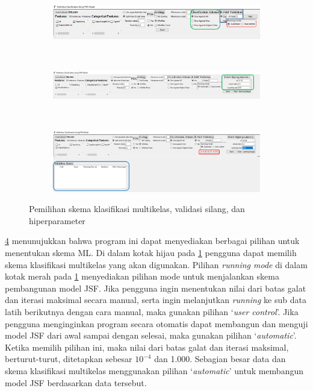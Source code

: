 \begin{figure}[h!]
\begin{subfigure}[h]{\textwidth}
  \centering
  \includegraphics[width=.98\linewidth]{SSprogram/06.png}  
  \caption{}
  \label{fig: ss 06}
\end{subfigure}
\\
\begin{subfigure}[h]{\textwidth}
  \centering
  \includegraphics[width=.98\linewidth]{SSprogram/07.png}
  \caption{}
  \label{fig: ss 07}
\end{subfigure}%
\\
\begin{subfigure}[h]{\textwidth}
  \centering
  \includegraphics[width=.98\linewidth]{SSprogram/08.png}  
  \caption{}
  \label{fig: ss 08}
\end{subfigure}
\caption{Pemilihan skema klasifikasi multikelas, validasi silang, dan hiperparameter}
\label{fig: skema klas, cv, dan hyperpar}
\end{figure}

\noindent \ref{fig: skema klas, cv, dan hyperpar} menunujukkan bahwa program ini dapat menyediakan berbagai pilihan untuk menentukan skema ML. Di dalam kotak hijau pada \ref{fig: ss 06} pengguna dapat memilih skema klasifikasi multikelas yang akan digunakan. Pilihan \emph{running mode} di dalam kotak merah pada \ref{fig: ss 06} menyediakan pilihan mode untuk menjalankan skema pembangunan model JSF. Jika pengguna ingin menentukan nilai dari batas galat dan iterasi maksimal secara manual, serta ingin melanjutkan \emph{running} ke sub data latih berikutnya dengan cara manual, maka gunakan pilihan `\emph{user control}'. Jika pengguna menginginkan program secara otomatis dapat membangun dan menguji model JSF dari awal sampai dengan selesai, maka gunakan pilihan `\emph{automatic}'. Ketika memilih pilihan ini, maka nilai dari batas galat dan iterasi maksimal, berturut-turut, ditetapkan sebesar $10^{-4}$ dan 1.000. Sebagian besar data dan skema klasifikasi multikelas menggunakan pilihan `\emph{automatic}' untuk membangun model JSF berdasarkan data tersebut.

